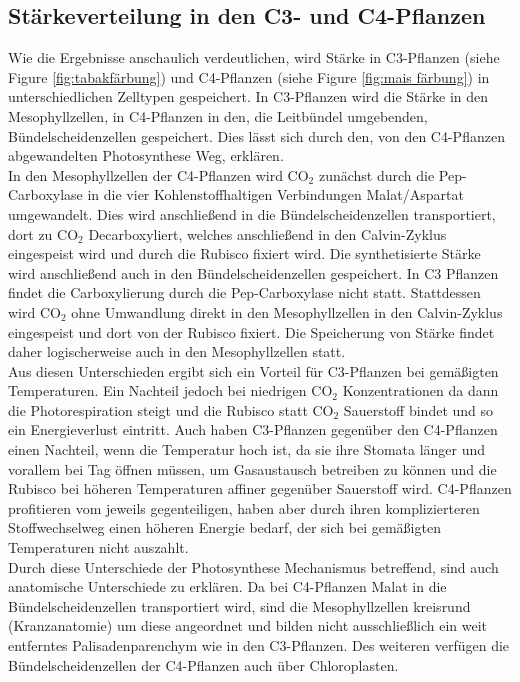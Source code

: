 \documentclass[10pt,a4paper]{article}
\begin{document}
	\subsection{Stärkeverteilung in den C3- und C4-Pflanzen}
	Wie die Ergebnisse anschaulich verdeutlichen, wird Stärke in C3-Pflanzen (siehe Figure \ref{fig:tabakfärbung}) und C4-Pflanzen (siehe Figure \ref{fig:mais färbung}) in unterschiedlichen Zelltypen gespeichert. In C3-Pflanzen wird die Stärke in den Mesophyllzellen, in C4-Pflanzen in den, die Leitbündel umgebenden, Bündelscheidenzellen gespeichert. Dies lässt sich durch den, von den C4-Pflanzen abgewandelten Photosynthese Weg, erklären. \\
	In den Mesophyllzellen der C4-Pflanzen wird CO$_2$ zunächst durch die Pep-Carboxylase in die vier Kohlenstoffhaltigen Verbindungen Malat/Aspartat umgewandelt. Dies wird anschließend in die Bündelscheidenzellen transportiert, dort zu CO$_2$ Decarboxyliert, welches anschließend in den Calvin-Zyklus eingespeist wird und durch die Rubisco fixiert wird. Die synthetisierte Stärke wird anschließend auch in den Bündelscheidenzellen gespeichert.
	In C3 Pflanzen findet die Carboxylierung durch die Pep-Carboxylase nicht statt. Stattdessen wird CO$_2$ ohne Umwandlung direkt in den Mesophyllzellen in den Calvin-Zyklus eingespeist und dort von der Rubisco fixiert. Die Speicherung von Stärke findet daher logischerweise auch in den Mesophyllzellen statt.\\
	Aus diesen Unterschieden ergibt sich ein Vorteil für C3-Pflanzen bei gemäßigten Temperaturen. Ein Nachteil jedoch bei niedrigen CO$_2$ Konzentrationen da dann die Photorespiration steigt und die Rubisco statt CO$_2$ Sauerstoff bindet und so ein Energieverlust eintritt. Auch haben C3-Pflanzen gegenüber den C4-Pflanzen einen Nachteil, wenn die Temperatur hoch ist, da sie ihre Stomata länger und vorallem bei Tag öffnen müssen, um Gasaustausch betreiben zu können und die Rubisco bei höheren Temperaturen affiner gegenüber Sauerstoff wird. C4-Pflanzen profitieren vom jeweils gegenteiligen, haben aber durch ihren komplizierteren Stoffwechselweg einen höheren Energie bedarf, der sich bei gemäßigten Temperaturen nicht auszahlt.\\
	Durch diese Unterschiede der Photosynthese Mechanismus betreffend, sind auch anatomische Unterschiede zu erklären. Da bei C4-Pflanzen Malat in die Bündelscheidenzellen transportiert wird, sind die Mesophyllzellen kreisrund (Kranzanatomie) um diese angeordnet und bilden nicht ausschließlich ein weit entferntes Palisadenparenchym wie in den C3-Pflanzen. Des weiteren verfügen die Bündelscheidenzellen der C4-Pflanzen auch über Chloroplasten. 
	
\end{document}
